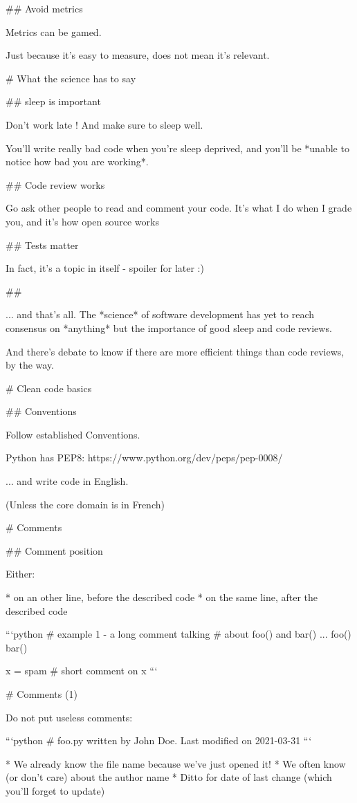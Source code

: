 ## Avoid metrics

Metrics can be gamed.

Just because it's easy to measure, does not mean it's relevant.

#  What the science has to say


## sleep is important

Don't work late ! And make sure to sleep well.

You'll write really bad code when you're sleep deprived, and you'll be
*unable to notice how bad you are working*.

## Code review works

Go ask other people to read and comment your code. It's what I do when I
grade you, and it's how open source works

## Tests matter

In fact, it's a topic in itself - spoiler for later :)

##

... and that's all. The *science* of software development has yet to reach
consensus on *anything* but the importance of good sleep and code reviews.

And there's debate to know if there are more efficient things than code
reviews, by the way.


# Clean code basics

## Conventions

Follow established Conventions.

Python has PEP8:  https://www.python.org/dev/peps/pep-0008/

... and write code in English.

(Unless the core domain is in French)

# Comments

## Comment position

Either:

* on an other line, before the described code
* on the same line, after the described code

\vfill

```python
# example 1 - a long comment talking
# about foo() and bar() ...
foo()
bar()

x = spam  # short comment on x
```


# Comments (1)

Do not put useless comments:

```python
# foo.py written by John Doe. Last modified on 2021-03-31
```

* We already know the file name because  we've just opened it!
* We often know (or don't care) about the author name
* Ditto for date of last change (which you'll forget to update)

